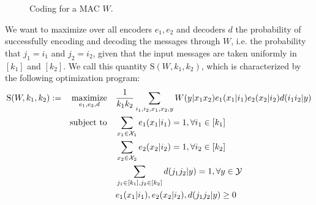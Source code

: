 \begin{figure}[!h]
\begin{center}
\end{center}
\caption{Coding for a MAC $W$.}
\label{fig:MACcoding}
\end{figure}

We want to maximize over all encoders $e_1,e_2$ and decoders $d$ the probability of successfully encoding and decoding the messages through $W$, i.e. the probability that $j_1 = i_1$ and  $j_2 = i_2$, given that the input messages are taken uniformly in $[k_1]$ and $[k_2]$. We call this quantity $\mathrm{S}(W,k_1,k_2)$, which is characterized by the following optimization program:
\begin{equation}
\label{eq:def-succ-prob-mac}
  \begin{aligned}
    \mathrm{S}(W,k_1,k_2) := &&\underset{e_1,e_2,d}{\operatorname{\text{maximize}}} &&& \frac{1}{k_1k_2} \sum_{i_1,i_2,x_1,x_2,y} W(y|x_1x_2)e_1(x_1|i_1)e_2(x_2|i_2)d(i_1i_2|y)\\
    &&\operatorname{\text{subject to}} &&& \sum_{x_1 \in \mathcal{X}_1} e_1(x_1|i_1) = 1, \forall i_1 \in [k_1]\\
    &&&&&  \sum_{x_2 \in \mathcal{X}_2} e_2(x_2|i_2) = 1, \forall i_2 \in [k_2]\\
    &&&&& \sum_{j_1 \in [k_1],j_2 \in [k_2]} d(j_1j_2|y) = 1, \forall y \in \mathcal{Y}\\
    &&&&& e_1(x_1|i_1), e_2(x_2|i_2), d(j_1j_2|y) \geq 0
  \end{aligned}
\end{equation}

